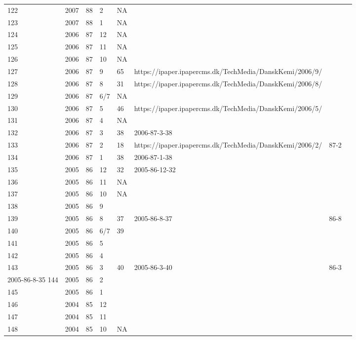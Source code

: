 \begin{longtable}{ |l|l|l|l|l|l|l|l| }
122 & 2007 & 88 &     2 &      NA &  &  & \\
123 & 2007 & 88 &     1 &      NA &  &  & \\
124 & 2006 & 87 &    12 &      NA &  &  & \\
125 & 2006 & 87 &    11 &      NA &  &  & \\
126 & 2006 & 87 &    10 &      NA &  &  & \\
127 & 2006 & 87 &     9 &      65 & https://ipaper.ipapercms.dk/TechMedia/DanskKemi/2006/9/ &  & \\
128 & 2006 & 87 &     8 &      31 & https://ipaper.ipapercms.dk/TechMedia/DanskKemi/2006/8/ &  & \\
129 & 2006 & 87 &   6/7 &      NA &  &  & \\
130 & 2006 & 87 &     5 &      46 & https://ipaper.ipapercms.dk/TechMedia/DanskKemi/2006/5/ &  & \\
131 & 2006 & 87 &     4 &      NA &  &  & \\
132 & 2006 & 87 &     3 &      38 & 2006-87-3-38 &  & \\
133 & 2006 & 87 &     2 &      18 & https://ipaper.ipapercms.dk/TechMedia/DanskKemi/2006/2/ & 87-2  & \\
134 & 2006 & 87 &     1 &      38 & 2006-87-1-38 &  & \\
135 & 2005 & 86 &    12 &      32 & 2005-86-12-32 &  & \\
136 & 2005 & 86 &    11 &      NA &  &  & \\
137 & 2005 & 86 &    10 &      NA &  &  & \\
138 & 2005 & 86 &     9 &         &  &  & \\
139 & 2005 & 86 &     8 &      37 & 2005-86-8-37 & 86-8  & \\
140 & 2005 & 86 &   6/7 &      39 &  &  & \\
141 & 2005 & 86 &     5 &         &  &  & \\
142 & 2005 & 86 &     4 &         & &  & \\
143 & 2005 & 86 &     3 &      40 &  2005-86-3-40& 86-3 & \\  2005-86-8-35
144 & 2005 & 86 &     2 &         &  &  & \\
145 & 2005 & 86 &     1 &         &  &  & \\
146 & 2004 & 85 &    12 &         &  &  & \\
147 & 2004 & 85 &    11 &         &  &  & \\
148 & 2004 & 85 &    10 &      NA &  &  & \\

\end{longtable}

